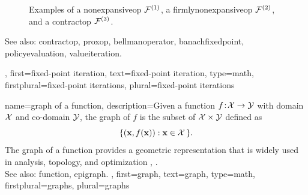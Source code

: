 {{\begin{figure}[H]
\begin{center}
			\end{center} 
		\caption{Examples of a \gls{nonexpansiveop} $\mathcal{F}^{(1)}$, a \gls{firmlynonexpansiveop} 
			$\mathcal{F}^{(2)}$, and a \gls{contractop} $\mathcal{F}^{(3)}$. \label{fig_examples_nonexp_dict}}
		\end{figure} 
		See also: \gls{contractop}, \gls{proxop}, \gls{bellmanoperator}, \gls{banachfixedpoint}, \gls{policyevaluation}, 
		\gls{valueiteration}.},
	first={fixed-point iteration},
	text={fixed-point iteration},
	type=math, 
	firstplural={fixed-point iterations}, 
	plural={fixed-point iterations}
}

{name={graph of a function},
	description={Given a \gls{function} $f\!:\!\mathcal{X} \to \mathcal{Y}$
		with \gls{domain} $\mathcal{X}$ and \gls{co-domain} $\mathcal{Y}$,
		the graph of $f$ is the subset of $\mathcal{X} \times \mathcal{Y}$ 
		defined as
		\[
		\{ ({\bf x},f({\bf x})) : {\bf x} \in \mathcal{X} \,\}.
		\]
		The graph of a \gls{function} provides a geometric representation 
		that is widely used in analysis, topology, and \gls{optimization}
		\cite{MunkresTopology2000}, \cite{RockafellarBook}.
		\\
		See also: \gls{function}, \gls{epigraph}. }, 
	first={graph},
	text={graph},
	type=math, 
	firstplural={graphs},
	plural={graphs}
}

